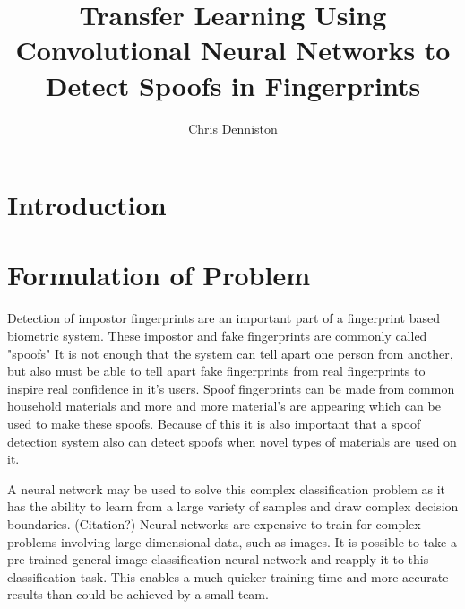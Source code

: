 \documentclass[]{article}
\title{Transfer Learning Using Convolutional Neural Networks to Detect Spoofs in Fingerprints}
\author{Chris Denniston}
\begin{document}
\maketitle

\begin{abstract}

\end{abstract}
\section{Introduction}

\section{Formulation of Problem}
Detection of impostor fingerprints are an important part of a fingerprint based biometric system. These impostor and fake fingerprints are commonly called "spoofs" It is not enough that the system can tell apart one person from another, but also must be able to tell apart fake fingerprints from real fingerprints to inspire real confidence in it's users. Spoof fingerprints can be made from common household materials and more and more material's are appearing which can be used to make these spoofs. Because of this it is also important that a spoof detection system also can detect spoofs when novel types of materials are used on it. 

A neural network may be used to solve this complex classification problem as it has the ability to learn from a large variety of samples and draw complex decision boundaries. (Citation?) Neural networks are expensive to train for complex problems involving large dimensional data, such as images. It is possible to take a pre-trained general image classification neural network and reapply it to this classification task. This enables a much quicker training time and more accurate results than could be achieved by a small team. 
\end{document}
